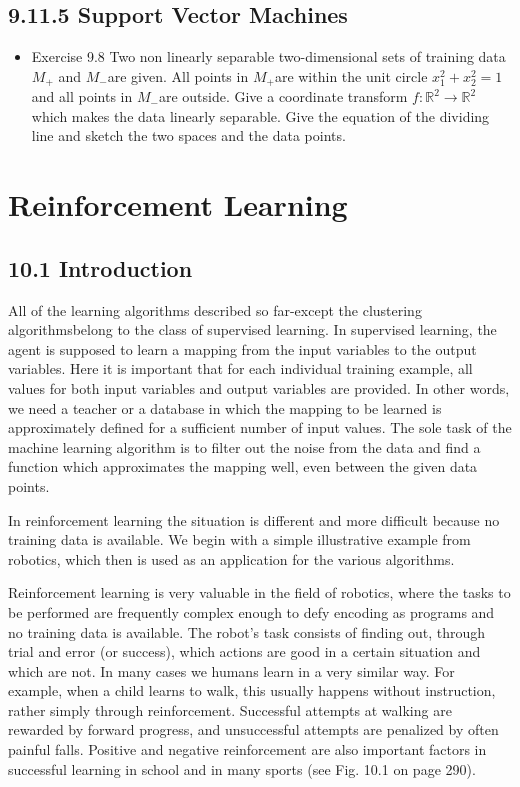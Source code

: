 \documentclass[10pt]{article}
\begin{document}
\subsection*{9.11.5 Support Vector Machines}
\begin{itemize}
  \item Exercise 9.8 Two non linearly separable two-dimensional sets of training data $M_{+}$ and $M_{-}$are given. All points in $M_{+}$are within the unit circle $x_{1}^{2}+x_{2}^{2}=1$ and all points in $M_{-}$are outside. Give a coordinate transform $f: \mathbb{R}^{2} \rightarrow \mathbb{R}^{2}$ which makes the data linearly separable. Give the equation of the dividing line and sketch the two spaces and the data points.
\end{itemize}

\section*{Reinforcement Learning}
\subsection*{10.1 Introduction}
All of the learning algorithms described so far-except the clustering algorithmsbelong to the class of supervised learning. In supervised learning, the agent is supposed to learn a mapping from the input variables to the output variables. Here it is important that for each individual training example, all values for both input variables and output variables are provided. In other words, we need a teacher or a database in which the mapping to be learned is approximately defined for a sufficient number of input values. The sole task of the machine learning algorithm is to filter out the noise from the data and find a function which approximates the mapping well, even between the given data points.

In reinforcement learning the situation is different and more difficult because no training data is available. We begin with a simple illustrative example from robotics, which then is used as an application for the various algorithms.

Reinforcement learning is very valuable in the field of robotics, where the tasks to be performed are frequently complex enough to defy encoding as programs and no training data is available. The robot's task consists of finding out, through trial and error (or success), which actions are good in a certain situation and which are not. In many cases we humans learn in a very similar way. For example, when a child learns to walk, this usually happens without instruction, rather simply through reinforcement. Successful attempts at walking are rewarded by forward progress, and unsuccessful attempts are penalized by often painful falls. Positive and negative reinforcement are also important factors in successful learning in school and in many sports (see Fig. 10.1 on page 290).
\end{document}
